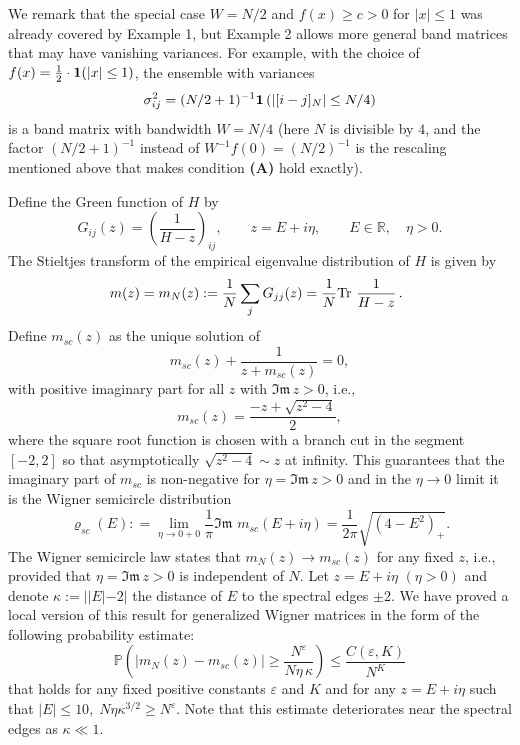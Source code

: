 \documentclass[draft]{article}
\newcommand{\e}{\varepsilon}
\newcommand{\bR}{{\mathbb R}}
\newcommand{\tr}{\mbox{Tr\,}}
\newcommand{\mg}{{m_N}}
\newcommand{\be}{\begin{equation}}
\newcommand{\ee}{\end{equation}}
\newcommand{\im}{{\mathfrak{Im} \, }}
\renewcommand{\P}{{\mathbb P}}
\numberwithin{equation}{section}
\numberwithin{theorem}{section}
\numberwithin{definition}{section}
\numberwithin{remark}{section}
\begin{document}
We remark that the special case $W=N/2$ and $f(x)\ge c>0$ for $|x|\le 1$
was already covered by Example 1, but Example 2 allows more general band matrices that
 may have vanishing variances.  For example, with the choice of 
 $f(x) = \frac{1}{2}\cdot {\bf 1}(|x|\le 1)$,
the ensemble  with variances
\be
\sigma_{ij}^2=(N/2+1)^{-1}{\bf 1}\left(|[i-j]_N|\leq N/4 \right)
\ee
is  a band matrix with bandwidth $W=N/4$ (here $N$ is divisible by $4$, and the factor
$(N/2+1)^{-1}$ instead of $W^{-1}f(0)=(N/2)^{-1}$ is the rescaling mentioned above that makes
condition {\bf (A)} hold exactly).

 

\bigskip

Define  the Green function of $H$ by 
\be\label{green}
G_{ij}(z) =\left(\frac1{H-z}\right)_{ij}, \qquad z=E+i\eta, \qquad E\in \bR, \quad \eta>0.
\ee
The Stieltjes transform of the empirical 
eigenvalue distribution of  $H $ is given by  
\be
 m(z)=\mg (z): =   \frac{1}{N}    \sum_j G_{jj}(z) = \frac{1}{N} \tr\, \frac{1}{H-z}\, .\,\,\, 
\label{mNdef}
\ee
Define $m_{sc} (z)$ as the unique solution of
\be\label{defmsc} 
m_{sc} (z)  + \frac{1}{z+m_{sc} (z)} = 0,
\ee
with positive imaginary part for all $z$ with $\im z > 0$, i.e.,
\be\label{temp2.8}
m_{sc}(z)=\frac{-z+\sqrt{z^2-4}}{2},
\ee
where the square root function is chosen with a branch cut in the segment
$[-2,2]$ so that asymptotically $\sqrt{z^2-4}\sim z$ at infinity.
This guarantees that the imaginary part of $m_{sc}$ is non-negative for   $\eta=\im  z > 0$ and 
in the $\eta\to 0$ limit  it is the 
Wigner semicircle distribution
\be
   \varrho_{sc}(E) : = \lim_{\eta\to 0+0}\frac{1}{\pi}\im \, m_{sc}(E+i\eta)
 = \frac{1}{2\pi}
  \sqrt{ (4-E^2)_+}.
\label{def:sc}
\ee
 The Wigner semicircle law \cite{W} states that  $m_N(z) \to m_{sc} (z) $
for any fixed $z$, i.e.,
 provided that $\eta=\im z>0$ is independent of $N$. 
 Let $z=E+i\eta$ $(\eta>0)$ and denote   $\kappa:= ||E|-2|$
the distance of $E$ to the spectral edges  $\pm 2$.
 We have proved \cite{EYY2} a  local version of this result for generalized Wigner
matrices in the form of  the following probability estimate: 
\be\label{mainlsresultfake}
\P\left(|\mg(z)-m_{sc}(z)| \geq
 \frac{N^\e}{{N\eta}\, \kappa}\right)\leq \frac{C(\e, K)}{N^K}
\ee
that holds for  any fixed positive constants $\e$ and  $K$ and for
 any  $z= E+i\eta$ such that $ |E|\le 10, \; N\eta\kappa^{3/2}\ge N^\e$.
Note that this estimate deteriorates near the spectral edges as $\kappa\ll 1$. 

\medskip
\end{document}
